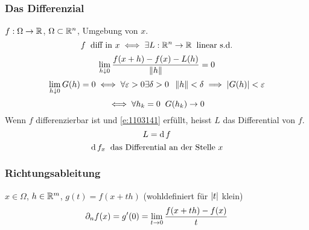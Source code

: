 \subsubsection{Das Differenzial}
$f:\Omega\rightarrow\mathbb{R}$, $\Omega\subset\mathbb{R}^n$, Umgebung von $x$.
\[f\hspace{2mm}\text{diff in $x$}\iff \exists L:\mathbb{R}^n\rightarrow\mathbb{R}\hspace{2mm}\text{linear s.d.}\]
\begin{equation}
  \label{e:1103141}
  \lim_{h\downarrow 0}\frac{f(x+h)-f(x)-L(h)}{\left\| h \right\|}=0
\end{equation}
\[\lim_{h\downarrow 0}G(h)=0\iff \forall \varepsilon>0\exists \delta>0\hspace{2mm}\left\| h \right\|<\delta\implies\mathopen| G(h) \mathclose|<\varepsilon\]
\[\iff \forall h_k=0\hspace{2mm} G(h_k)\rightarrow 0\]
Wenn $f$ differenzierbar ist und \ref{e:1103141} erfüllt, heisst $L$ das Differential von $f$.
\[L=\operatorname{d} f\]
\[\operatorname{d} f_x \hspace{2mm} \text{das Differential an der Stelle $x$}\]
\subsubsection{Richtungsableitung}
$x\in\Omega$, $h\in\mathbb{R}^m$, $g(t)=f(x+th)$ (wohldefiniert für $\mathopen| t \mathclose|$ klein)
\[\partial_n f(x)=g'(0)=\displaystyle\lim_{t\rightarrow0}\frac{f(x+th)-f(x)}{t}\]
